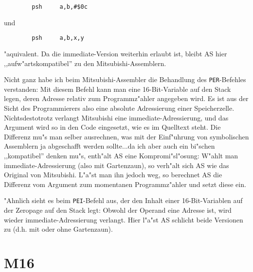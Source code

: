 \documentclass[12pt,a4paper,twoside]{report}
\newcommand{\tty}[1]{{\tt #1}}
\begin{document}
{\begin{verbatim}
        psh     a,b,#$0c
\end{verbatim}
und
\begin{verbatim}
        psh     a,b,x,y
\end{verbatim}
"aquivalent.  Da die immediate-Version weiterhin erlaubt ist, bleibt
AS hier ,,aufw"artskompatibel'' zu den Mitsubishi-Assemblern.
\par
Nicht ganz habe ich beim Mitsubishi-Assembler die Behandlung des
\tty{PER}-Befehles verstanden: Mit diesem Befehl kann man eine
16-Bit-Variable auf den Stack legen, deren Adresse relativ zum
Programmz"ahler angegeben wird.  Es ist aus der Sicht des Programmierers
also eine absolute Adressierung einer Speicherzelle.  Nichtsdestotrotz
verlangt Mitsubishi eine immediate-Adressierung, und das Argument wird so
in den Code eingesetzt, wie es im Quelltext steht.  Die Differenz mu"s
man selber ausrechnen, was mit der Einf"uhrung von symbolischen Assemblern
ja abgeschafft werden sollte...da ich aber auch ein bi"schen ,,kompatibel''
denken mu"s, enth"alt AS eine Kompromi"sl"osung: W"ahlt man
immediate-Adressierung (also mit Gartenzaun), so verh"alt sich AS wie das
Original von Mitsubishi.  L"a"st man ihn jedoch weg, so berechnet AS die
Differenz vom Argument zum momentanen Programmz"ahler und setzt diese
ein.
\par
"Ahnlich sieht es beim \tty{PEI}-Befehl aus, der den Inhalt einer
16-Bit-Variablen auf der Zeropage auf den Stack legt:  Obwohl der Operand
eine Adresse ist, wird wieder immediate-Adressierung verlangt.  Hier
l"a"st AS schlicht beide Versionen zu (d.h. mit oder ohne Gartenzaun).


\section{M16}

}
\end{document}
